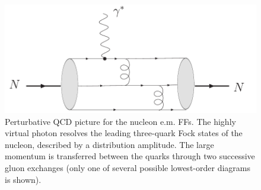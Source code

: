 \begin{figure}[h]
\centerline{  
  \includegraphics[width = 6 cm]{ff_pqcd.pdf} 
}
\caption{\small Perturbative QCD picture for the nucleon 
e.m. FFs. The highly virtual photon resolves 
the leading three-quark Fock states of the nucleon, described by 
a distribution amplitude. The large momentum is transferred between the quarks 
through two successive gluon exchanges (only one of several possible 
lowest-order diagrams is shown). }
\label{ff_pqcd}
\end{figure}



